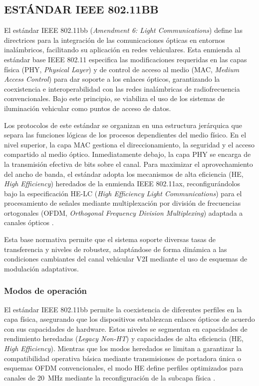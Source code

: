 \subsection{ESTÁNDAR IEEE 802.11BB}

El estándar IEEE 802.11bb (\textit{Amendment 6: Light Communications}) \cite{ieee80211bb2023} define las directrices para la integración de las comunicaciones ópticas en entornos inalámbricos, facilitando su aplicación en redes vehiculares. Esta enmienda al estándar base IEEE 802.11 especifica las modificaciones requeridas en las capas física (PHY, \textit{Physical Layer}) y de control de acceso al medio (MAC, \textit{Medium Access Control}) para dar soporte a los enlaces ópticos, garantizando la coexistencia e interoperabilidad con las redes inalámbricas de radiofrecuencia convencionales. Bajo este principio, se viabiliza el uso de los sistemas de iluminación vehicular como puntos de acceso de datos.

Los protocolos de este estándar se organizan en una estructura jerárquica que separa las funciones lógicas de los procesos dependientes del medio físico. En el nivel superior, la capa MAC gestiona el direccionamiento, la seguridad y el acceso compartido al medio óptico. Inmediatamente debajo, la capa PHY se encarga de la transmisión efectiva de bits sobre el canal. Para maximizar el aprovechamiento del ancho de banda, el estándar adopta los mecanismos de alta eficiencia (HE, \textit{High Efficiency}) heredados de la enmienda IEEE 802.11ax, reconfigurándolos bajo la especificación HE-LC (\textit{High Efficiency Light Communications}) para el procesamiento de señales mediante multiplexación por división de frecuencias ortogonales (OFDM, \textit{Orthogonal Frequency Division Multiplexing}) adaptada a canales ópticos \cite{obeed2019optimize}.

Esta base normativa permite que el sistema soporte diversas tasas de transferencia y niveles de robustez, adaptándose de forma dinámica a las condiciones cambiantes del canal vehicular V2I mediante el uso de esquemas de modulación adaptativos.

\subsubsection{Modos de operación}
El estándar IEEE 802.11bb permite la coexistencia de diferentes perfiles en la capa física, asegurando que los dispositivos establezcan enlaces ópticos de acuerdo con sus capacidades de hardware. Estos niveles se segmentan en capacidades de rendimiento heredadas (\textit{Legacy Non-HT}) y capacidades de alta eficiencia (HE, \textit{High Efficiency}). Mientras que los modos heredados se limitan a garantizar la compatibilidad operativa básica mediante transmisiones de portadora única o esquemas OFDM convencionales, el modo HE define perfiles optimizados para canales de 20~MHz mediante la reconfiguración de la subcapa física \cite{ieee80211bb2023}. 

